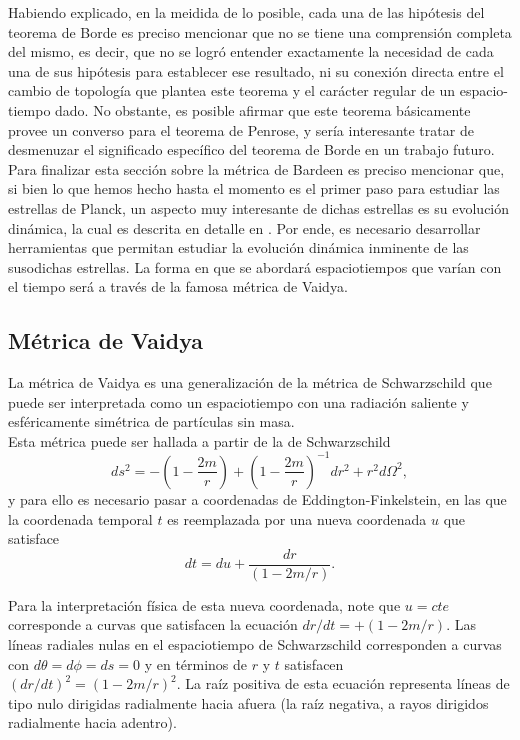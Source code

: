 \documentclass[16pt,a4paper]{article}
\numberwithin{equation}{section}
\theoremstyle{definition}
\begin{document}
Habiendo explicado, en la meidida de lo posible, cada una de las hipótesis del teorema de Borde es preciso mencionar que no se tiene una comprensión completa del mismo, es decir, que no se logró entender exactamente la necesidad de cada una de sus hipótesis para establecer ese resultado, ni su conexión directa entre el cambio de topología que plantea este teorema y el carácter regular de un espacio-tiempo dado. No obstante, es posible afirmar que este teorema básicamente provee un converso para el teorema de Penrose, y sería interesante tratar de desmenuzar el significado específico del teorema de Borde en un trabajo futuro.\\

Para finalizar esta sección sobre la métrica de Bardeen es preciso mencionar que, si bien lo que hemos hecho hasta el momento es el primer paso para estudiar las estrellas de Planck, un aspecto muy interesante de dichas estrellas es su evolución dinámica, la cual es descrita en detalle en \cite{rovelliquantum}. Por ende, es necesario desarrollar herramientas que permitan estudiar la evolución dinámica inminente de las susodichas estrellas. La forma en que se abordará espaciotiempos que varían con el tiempo será a través de la famosa métrica de Vaidya.

\subsection{Métrica de Vaidya}

La métrica de Vaidya \cite{padmanabhan} es una generalización de la métrica de Schwarzschild que puede ser interpretada como un espaciotiempo con una radiación saliente y esféricamente simétrica de partículas sin masa.\\

Esta métrica puede ser hallada a partir de la de Schwarzschild 
\begin{equation}
ds^2 = -\left( 1 - \frac{2m}{r} \right) + \left( 1 - \frac{2m}{r} \right)^{-1}dr^2 + r^2d\Omega^2,
\end{equation}
y para ello es necesario pasar a coordenadas de Eddington-Finkelstein, en las que la coordenada temporal $t$ es reemplazada por una nueva coordenada $u$ que satisface
\begin{equation}
dt = du + \frac{dr}{(1 - 2m/r)}.
\end{equation}

Para la interpretación física de esta nueva coordenada, note que $u = cte$ corresponde a curvas que satisfacen la ecuación $dr/dt = +\left( 1 -2m/r \right)$. Las líneas radiales nulas en el espaciotiempo de Schwarzschild corresponden a curvas con $d\theta = d\phi = ds = 0$ y en términos de $r$ y $t$ satisfacen $(dr/dt)^2 = \left( 1 -2m/r \right)^2$. La raíz positiva de esta ecuación representa líneas de tipo nulo dirigidas radialmente hacia afuera (la raíz negativa, a rayos dirigidos radialmente hacia adentro).\\
\end{document}
